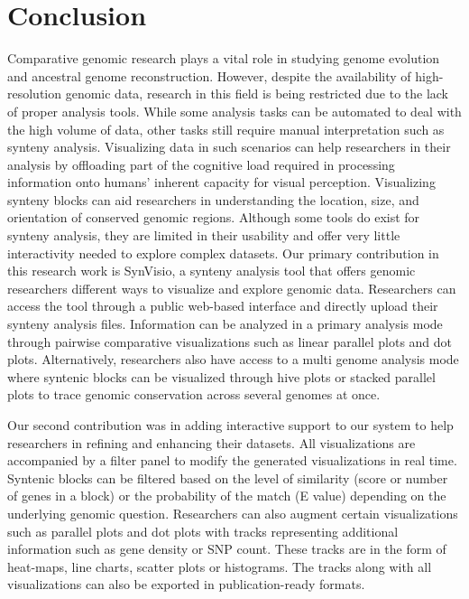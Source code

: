 \chapter{Conclusion}

Comparative genomic research plays a vital role in studying genome evolution and ancestral genome reconstruction. However, despite the availability of high-resolution genomic data, research in this field is being restricted due to the lack of proper analysis tools. While some analysis tasks can be automated to deal with the high volume of data, other tasks still require manual interpretation such as synteny analysis. Visualizing data in such scenarios can help researchers in their analysis by offloading part of the cognitive load required in processing information onto humans' inherent capacity for visual perception. Visualizing synteny blocks can aid researchers in understanding the location, size, and orientation of conserved genomic regions. Although some tools do exist for synteny analysis, they are limited in their usability and offer very little interactivity needed to explore complex datasets. Our primary contribution in this research work is SynVisio, a synteny analysis tool that offers genomic researchers different ways to visualize and explore genomic data. Researchers can access the tool through a public web-based interface and directly upload their synteny analysis files. Information can be analyzed in a primary analysis mode through pairwise comparative visualizations such as linear parallel plots and dot plots. Alternatively, researchers also have access to a multi genome analysis mode where syntenic blocks can be visualized through hive plots or stacked parallel plots to trace genomic conservation across several genomes at once.

Our second contribution was in adding interactive support to our system to help researchers in refining and enhancing their datasets. All visualizations are accompanied by a filter panel to modify the generated visualizations in real time. Syntenic blocks can be filtered based on the level of similarity (score or number of genes in a block) or the probability of the match (E value) depending on the underlying genomic question. Researchers can also augment certain visualizations such as parallel plots and dot plots with tracks representing additional information such as gene density or SNP count. These tracks are in the form of heat-maps, line charts, scatter plots or histograms. The tracks along with all visualizations can also be exported in publication-ready formats.

